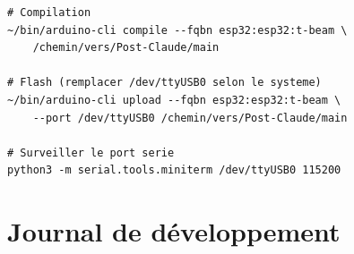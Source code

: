 \documentclass[12pt,a4paper]{article}
\begin{document}
\begin{lstlisting}[style=shell, caption={Compiler et flasher le firmware}]
# Compilation
~/bin/arduino-cli compile --fqbn esp32:esp32:t-beam \
    /chemin/vers/Post-Claude/main

# Flash (remplacer /dev/ttyUSB0 selon le systeme)
~/bin/arduino-cli upload --fqbn esp32:esp32:t-beam \
    --port /dev/ttyUSB0 /chemin/vers/Post-Claude/main

# Surveiller le port serie
python3 -m serial.tools.miniterm /dev/ttyUSB0 115200
\end{lstlisting}

\section{Journal de développement}
\end{document}
